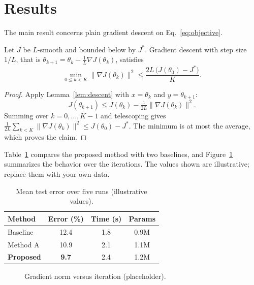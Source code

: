 \section{Results}\label{sec:results}
The main result concerns plain gradient descent on Eq.~\eqref{eq:objective}.
\begin{theorem}[Convergence]\label{thm:main}
Let $J$ be $L$-smooth and bounded below by $J^{\ast}$. Gradient descent with
step size $1/L$, that is $\theta_{k+1}=\theta_k-\tfrac{1}{L}\nabla J(\theta_k)$,
satisfies
\[
  \min_{0\le k<K}\lVert\nabla J(\theta_k)\rVert^{2}
  \le\frac{2L\,\bigl(J(\theta_0)-J^{\ast}\bigr)}{K}.
\]
\end{theorem}
\begin{proof}
Apply Lemma~\ref{lem:descent} with $x=\theta_k$ and $y=\theta_{k+1}$:
\[
  J(\theta_{k+1})\le J(\theta_k)-\tfrac{1}{2L}\lVert\nabla J(\theta_k)\rVert^{2}.
\]
Summing over $k=0,\dots,K-1$ and telescoping gives
$\tfrac{1}{2L}\sum_{k<K}\lVert\nabla J(\theta_k)\rVert^{2}\le J(\theta_0)-J^{\ast}$.
The minimum is at most the average, which proves the claim.
\end{proof}

Table~\ref{tab:results} compares the proposed method with two baselines, and
Figure~\ref{fig:overview} summarizes the behavior over the iterations. The
values shown are illustrative; replace them with your own data.

\begin{table}[t]
  \centering\small{}
  \caption{Mean test error over five runs (illustrative values).}\label{tab:results}
  \begin{tabular}{@{}lccc@{}}
    \toprule
    Method & Error (\%) & Time (s) & Params \\
    \midrule
    Baseline          & 12.4        & 1.8 & 0.9M \\
    Method A          & 10.9        & 2.1 & 1.1M \\
    \textbf{Proposed} & \textbf{9.7} & 2.4 & 1.2M \\
    \bottomrule
  \end{tabular}
\end{table}

\begin{figure}[t]
  \centering
  \caption{Gradient norm versus iteration (placeholder).}\label{fig:overview}
\end{figure}

